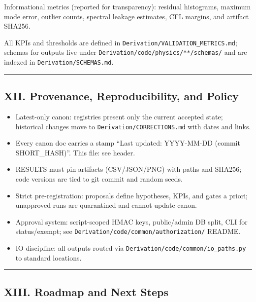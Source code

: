 \documentclass[
]{article}
\providecommand{\tightlist}{%
  \setlength{\itemsep}{0pt}\setlength{\parskip}{0pt}}
\begin{document}
Informational metrics (reported for transparency): residual histograms,
maximum mode error, outlier counts, spectral leakage estimates, CFL
margins, and artifact SHA256.

All KPIs and thresholds are defined in
\texttt{Derivation/VALIDATION\_METRICS.md}; schemas for outputs live
under \texttt{Derivation/code/physics/**/schemas/} and are indexed in
\texttt{Derivation/SCHEMAS.md}.

\begin{center}\rule{0.5\linewidth}{0.5pt}\end{center}

\hypertarget{xii.-provenance-reproducibility-and-policy}{%
\subsection{XII. Provenance, Reproducibility, and
Policy}\label{xii.-provenance-reproducibility-and-policy}}

\begin{itemize}
\tightlist
\item
  Latest-only canon: registries present only the current accepted state;
  historical changes move to \texttt{Derivation/CORRECTIONS.md} with
  dates and links.
\item
  Every canon doc carries a stamp ``Last updated: YYYY-MM-DD (commit
  SHORT\_HASH)''. This file: see header.
\item
  RESULTS must pin artifacts (CSV/JSON/PNG) with paths and SHA256; code
  versions are tied to git commit and random seeds.
\item
  Strict pre-registration: proposals define hypotheses, KPIs, and gates
  a priori; unapproved runs are quarantined and cannot update canon.
\item
  Approval system: script-scoped HMAC keys, public/admin DB split, CLI
  for status/exempt; see \texttt{Derivation/code/common/authorization/}
  README.
\item
  IO discipline: all outputs routed via
  \texttt{Derivation/code/common/io\_paths.py} to standard locations.
\end{itemize}

\begin{center}\rule{0.5\linewidth}{0.5pt}\end{center}

\hypertarget{xiii.-roadmap-and-next-steps}{%
\subsection{XIII. Roadmap and Next
Steps}\label{xiii.-roadmap-and-next-steps}}
\end{document}
